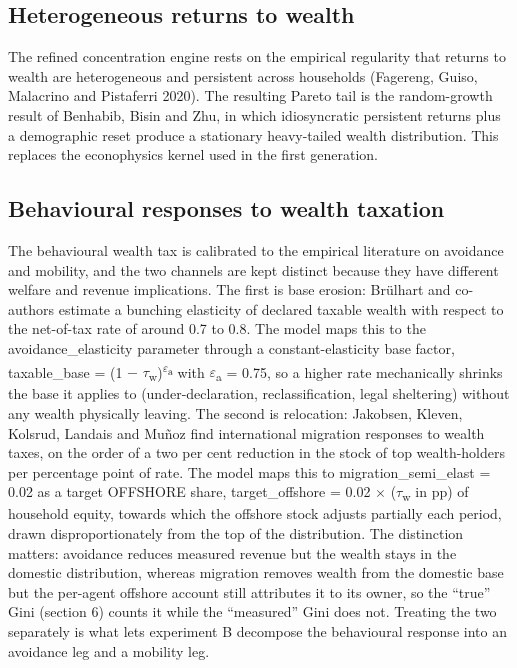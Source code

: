 \documentclass[11pt]{article}
\begin{document}
\hypertarget{heterogeneous-returns-to-wealth}{%
\subsection{Heterogeneous returns to
wealth}\label{heterogeneous-returns-to-wealth}}

The refined concentration engine rests on the empirical regularity that
returns to wealth are heterogeneous and persistent across households
(Fagereng, Guiso, Malacrino and Pistaferri 2020). The resulting Pareto
tail is the random-growth result of Benhabib, Bisin and Zhu, in which
idiosyncratic persistent returns plus a demographic reset produce a
stationary heavy-tailed wealth distribution. This replaces the
econophysics kernel used in the first generation.

\hypertarget{behavioural-responses-to-wealth-taxation}{%
\subsection{Behavioural responses to wealth
taxation}\label{behavioural-responses-to-wealth-taxation}}

The behavioural wealth tax is calibrated to the empirical literature on
avoidance and mobility, and the two channels are kept distinct because
they have different welfare and revenue implications. The first is base
erosion: Brülhart and co-authors estimate a bunching elasticity of
declared taxable wealth with respect to the net-of-tax rate of around
0.7 to 0.8. The model maps this to the avoidance\_elasticity parameter
through a constant-elasticity base factor, taxable\_base = (1 $-$
$\tau$\textsubscript{w})\textsuperscript{$\varepsilon$\textsubscript{a}} with
$\varepsilon$\textsubscript{a} = 0.75, so a higher rate mechanically shrinks the
base it applies to (under-declaration, reclassification, legal
sheltering) without any wealth physically leaving. The second is
relocation: Jakobsen, Kleven, Kolsrud, Landais and Muñoz find
international migration responses to wealth taxes, on the order of a two
per cent reduction in the stock of top wealth-holders per percentage
point of rate. The model maps this to migration\_semi\_elast = 0.02 as a
target OFFSHORE share, target\_offshore = 0.02 $\times$ ($\tau$\textsubscript{w} in
pp) of household equity, towards which the offshore stock adjusts
partially each period, drawn disproportionately from the top of the
distribution. The distinction matters: avoidance reduces measured
revenue but the wealth stays in the domestic distribution, whereas
migration removes wealth from the domestic base but the per-agent
offshore account still attributes it to its owner, so the ``true'' Gini
(section 6) counts it while the ``measured'' Gini does not. Treating the
two separately is what lets experiment B decompose the behavioural
response into an avoidance leg and a mobility leg.
\end{document}
